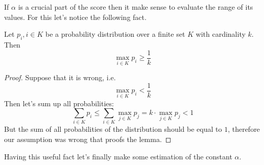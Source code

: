 If \( \alpha \) is a crucial part of the score then it make sense to evaluate the range of its values.
For this let's notice the following fact.
\begin{lemma} \label{lemma:maxprob_greater_than_avg}
    Let \( p_{i}, i \in K \) be a probability distribution over a finite set \( K \) with cardinality \( k \).
    Then
    \[
        \max\limits_{i \in K} p_i \geq \frac{1}{k}
    \]
\end{lemma}
\begin{proof}
    Suppose that it is wrong, i.e.
    \[
        \max\limits_{i \in K} p_i < \frac{1}{k}
    \]
    Then let's sum up all probabilities:
    \[
        \sum\limits_{i \in K} p_i \leq \sum\limits_{i \in K} \max\limits_{j \in K} p_j =
        k \cdot \max\limits_{j \in K} p_j < 1
    \]
    But the sum of all probabilities of the distribution should be equal to \( 1 \), therefore our assumption was
    wrong that proofs the lemma.
\end{proof}
Having this useful fact let's finally make some estimation of the constant \( \alpha \).
\begin{theorem}

\end{theorem}
